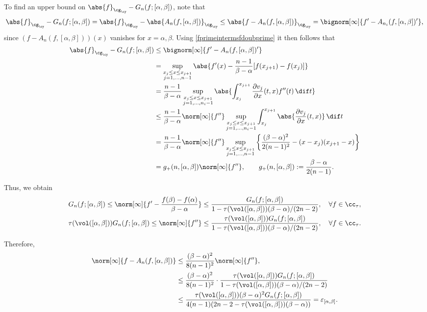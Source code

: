 \documentclass[]{elsarticle}
\theoremstyle{definition}
\theoremstyle{remark}
\newcommand{\GYnorm}[1]{\abs{#1}_{\cg_\cy}}
\begin{document}
To find an upper bound on $\GYnorm{f} -G_n(f;[\alpha,\beta])$, note that
\begin{equation*}
\GYnorm{f} -G_n(f;[\alpha,\beta]) =\GYnorm{f}  - \GYnorm{A_{n}(f,[\alpha,\beta])} \le \GYnorm{f-A_{n}(f,[\alpha,\beta])} = \bignorm[\infty]{f' -A_{n_i}(f,[\alpha,\beta])'},
\end{equation*}
since $(f-A_{n}(f,[\alpha,\beta]))(x)$ vanishes for $x=\alpha,\beta$. Using \eqref{fprimeintermsfdoubprime} it then follows that
\begin{align*}
\GYnorm{f} -G_n(f;[\alpha,\beta]) & \le \bignorm[\infty]{f' -A_{n}(f,[\alpha,\beta])'} \\
& = \sup_{\substack{x_j \le x \le x_{j+1}\\ j=1, \ldots, n-1 }} \abs{f'(x) -\frac{n-1}{\beta-\alpha}[f(x_{j+1})-f(x_j)]} \\
&=\frac{n-1}{\beta-\alpha} \sup_{\substack{x_j \le x \le x_{j+1}\\ j=1, \ldots, n_i-1 }} \abs{ \int_{x_j}^{x_{j+1}} \frac{\partial v_j}{\partial x}(t,x) f''(t) \, \dif t} \\
& \le \frac{n-1}{\beta-\alpha} \norm[\infty]{f''} \sup_{\substack{x_j \le x \le x_{j+1}\\ j=1, \ldots, n_i-1 }} \int_{x_j}^{x_{j+1}} \abs{\frac{\partial v_j}{\partial x}(t,x)} \, \dif t \\
&=\frac{n-1}{\beta-\alpha}\norm[\infty]{f''} \sup_{\substack{x_j \le x \le x_{j+1}\\ j=1, \ldots, n-1 }} \left \{\frac{(\beta-\alpha)^2}{2(n-1)^2} - (x-x_j)(x_{j+1}-x) \right\} \\
&= g_+(n,[\alpha,\beta]) \norm[\infty]{f''}, \qquad   g_+(n,[\alpha,\beta]):= \frac{\beta-\alpha}{2(n-1)}.
\end{align*}

Thus, we obtain
\begin{gather*}
G_n(f;[\alpha,\beta])\le \norm[\infty]{f'-\frac{f(\beta)-f(\alpha)}{\beta-\alpha}} \le \frac{G_n(f;[\alpha,\beta])}{1-\tau(\vol([\alpha,\beta]))(\beta-\alpha)/(2n-2)}, \quad \forall f \in \cc_{\tau}, \\
\tau(\vol([\alpha,\beta]))G_n(f;[\alpha,\beta]) \le \norm[\infty]{f''} \le \frac{\tau(\vol([\alpha,\beta]))G_n(f;[\alpha,\beta])}{1-\tau(\vol([\alpha,\beta]))(\beta-\alpha)/(2n-2)}, \quad \forall f \in \cc_{\tau}.
\end{gather*}

Therefore,
\begin{align*}
\norm[\infty]{f-A_{n}(f,[\alpha,\beta])}
& \le \frac{(\beta-\alpha)^2}{8(n-1)^2}\norm[\infty]{f''}, \\
& \le \frac{(\beta-\alpha)^2}{8(n-1)^2}\cdot\frac{\tau(\vol([\alpha,\beta]))G_n(f;[\alpha,\beta])}{1-\tau(\vol([\alpha,\beta]))(\beta-\alpha)/(2n-2)} \\
& \le \frac{\tau(\vol([\alpha,\beta]))(\beta-\alpha)^2 G_n(f;[\alpha,\beta])}{4(n-1)(2n-2-\tau(\vol([\alpha,\beta]))(\beta-\alpha))}=\varepsilon_{[\alpha,\beta]}.
\end{align*}
\end{document}
